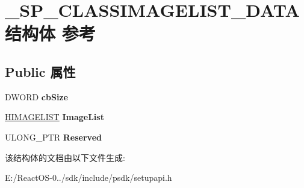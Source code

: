 \hypertarget{struct___s_p___c_l_a_s_s_i_m_a_g_e_l_i_s_t___d_a_t_a}{}\section{\+\_\+\+S\+P\+\_\+\+C\+L\+A\+S\+S\+I\+M\+A\+G\+E\+L\+I\+S\+T\+\_\+\+D\+A\+T\+A结构体 参考}
\label{struct___s_p___c_l_a_s_s_i_m_a_g_e_l_i_s_t___d_a_t_a}
\subsection*{Public 属性}
\begin{DoxyCompactItemize}
\item 
\mbox{\label{struct___s_p___c_l_a_s_s_i_m_a_g_e_l_i_s_t___d_a_t_a_a1c621e717c69293382cd04b6980a5e43}} 
D\+W\+O\+RD {\bfseries cb\+Size}
\item 
\mbox{\label{struct___s_p___c_l_a_s_s_i_m_a_g_e_l_i_s_t___d_a_t_a_ab662e2066d2b35863dba9c63a4986b12}} 
\hyperlink{struct___i_m_a_g_e_l_i_s_t}{H\+I\+M\+A\+G\+E\+L\+I\+ST} {\bfseries Image\+List}
\item 
\mbox{\label{struct___s_p___c_l_a_s_s_i_m_a_g_e_l_i_s_t___d_a_t_a_a5ce099d9e8a2e81cf159788b37c9b3de}} 
U\+L\+O\+N\+G\+\_\+\+P\+TR {\bfseries Reserved}
\end{DoxyCompactItemize}


该结构体的文档由以下文件生成\+:\begin{DoxyCompactItemize}
\item 
E\+:/\+React\+O\+S-\/0../sdk/include/psdk/setupapi.\+h\end{DoxyCompactItemize}
